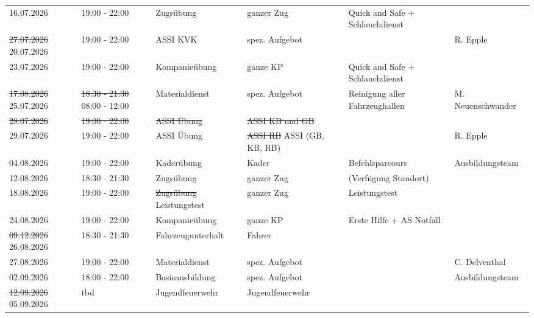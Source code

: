 \documentclass[11pt,a4paper]{article}
\begin{document}
\begin{adjustwidth}{1.5cm}{1.5cm}
\begin{longtable}{llllll}
16.07.2026 & 19:00 - 22:00 & Zugs\"ubung & ganzer Zug & \color{OliveGreen}Quick and Safe + Schlauchdienst & \color{OliveGreen} \\
\color{BrickRed}\sout{27.07.2026} \color{OliveGreen}20.07.2026 & 19:00 - 22:00 & ASSI KVK & spez. Aufgebot & \color{OliveGreen} & \color{OliveGreen}R. Epple \\
23.07.2026 & 19:00 - 22:00 & Kompanie\"ubung & ganze KP & \color{OliveGreen}Quick and Safe + Schlauchdienst & \color{OliveGreen} \\
\color{BrickRed}\sout{17.08.2026} \color{OliveGreen}25.07.2026 & \color{BrickRed}\sout{18:30 - 21:30} \color{OliveGreen}08:00 - 12:00 & Materialdienst & spez. Aufgebot & \color{OliveGreen}Reinigung aller Fahrzeughallen & \color{OliveGreen}M. Neuenschwander \\
\color{BrickRed}\sout{28.07.2026} & \color{BrickRed}\sout{19:00 - 22:00} & \color{BrickRed}\sout{ASSI \"Ubung} & \color{BrickRed}\sout{ASSI KB und GB} & \color{BrickRed}\sout{} & \color{BrickRed}\sout{} \\
29.07.2026 & 19:00 - 22:00 & ASSI \"Ubung & \color{BrickRed}\sout{ASSI RB} \color{OliveGreen}ASSI (GB, KB, RB) & \color{OliveGreen} & \color{OliveGreen}R. Epple \\
04.08.2026 & 19:00 - 22:00 & Kader\"ubung & Kader & \color{OliveGreen}Befehlsparcours & \color{OliveGreen}Ausbildungsteam \\
12.08.2026 & 18:30 - 21:30 & Zugs\"ubung & ganzer Zug & \color{OliveGreen}(Verf\"ugung Standort) & \color{OliveGreen} \\
18.08.2026 & 19:00 - 22:00 & \color{BrickRed}\sout{Zugs\"ubung} \color{OliveGreen}Leistungstest & ganzer Zug & \color{OliveGreen}Leistungstest & \color{OliveGreen} \\
24.08.2026 & 19:00 - 22:00 & Kompanie\"ubung & ganze KP & \color{OliveGreen}Erste Hilfe + AS Notfall & \color{OliveGreen} \\
\color{BrickRed}\sout{09.12.2026} \color{OliveGreen}26.08.2026 & 18:30 - 21:30 & Fahrzeugunterhalt & Fahrer & \color{OliveGreen} & \color{OliveGreen} \\
27.08.2026 & 19:00 - 22:00 & Materialdienst & spez. Aufgebot & \color{OliveGreen} & \color{OliveGreen}C. Delventhal \\
02.09.2026 & 18:00 - 22:00 & Basisausbildung & spez. Aufgebot & \color{OliveGreen} & \color{OliveGreen}Ausbildungsteam \\
\color{BrickRed}\sout{12.09.2026} \color{OliveGreen}05.09.2026 & tbd & Jugendfeuerwehr & Jugendfeuerwehr & \color{OliveGreen} & \color{OliveGreen} \\

\end{longtable}
\end{adjustwidth}
\end{document}
